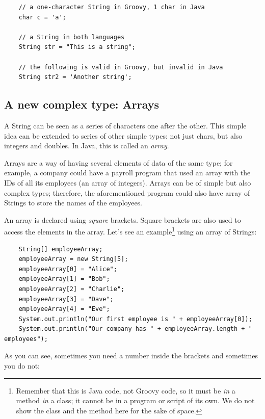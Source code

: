 \begin{verbatim}
    // a one-character String in Groovy, 1 char in Java
    char c = 'a';               

    // a String in both languages
    String str = "This is a string";

    // the following is valid in Groovy, but invalid in Java
    String str2 = 'Another string';  
\end{verbatim}

\subsection{A new complex type: Arrays}
\label{sec:arrays}

A String can be seen as a series of characters one after the
other. This simple idea can be extended to series of other simple
types: not just chars, but also integers and doubles. In Java, 
this is called an \emph{array}. 

Arrays are a way of having several elements of data of the same type;
for example, a company could have a payroll program that used an array with
the IDs of all its employees (an array of integers). 
Arrays can be of simple but also complex types; therefore, the
aforementioned program could also have array of Strings to store the
names of the employees. 

An array is declared using \emph{square} brackets. Square brackets are also
used to access the elements in the array. Let's see an 
example\footnote{Remember that this is Java code, not Groovy code, so
  it must be \emph{in} a method \emph{in} a class; it cannot be in a
  program or script of its own. We do not show the class and the
  method here for the sake of space.} using an
array of Strings: 

\begin{verbatim}
    String[] employeeArray;
    employeeArray = new String[5];
    employeeArray[0] = "Alice";
    employeeArray[1] = "Bob";
    employeeArray[2] = "Charlie";
    employeeArray[3] = "Dave";
    employeeArray[4] = "Eve";
    System.out.println("Our first employee is " + employeeArray[0]);
    System.out.println("Our company has " + employeeArray.length + " employees");
\end{verbatim}

As you can see, sometimes you need a number inside the brackets and
sometimes you do not: 

